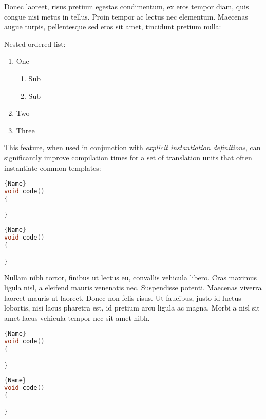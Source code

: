 Donec
laoreet, risus pretium egestas condimentum, ex eros tempor diam, quis
congue nisi metus in tellus. Proin tempor ac lectus nec elementum.
Maecenas augue turpis, pellentesque sed eros sit amet, tincidunt pretium
nulla:

Nested ordered list:

\begin{enumerate}\setlength{\leftmarginii}{6mm}
\item{One\begin{enumerate}
\item{Sub}
\item{Sub}
\end{enumerate}
}
\item{Two}
\item{Three}
\end{enumerate}

This feature, when used in conjunction with \emph{explicit instantiation
definitions}, can significantly improve compilation times for a set of
translation units that often instantiate common templates:

\noindent\begin{minipage}{.45\textwidth}
\begin{lstlisting}[language=C++, caption=code 1,frame=tb]{Name}
void code()
{

}
\end{lstlisting}
\end{minipage}\hfill
\begin{minipage}{.45\textwidth}
\begin{lstlisting}[language=C++, caption=code 2,frame=tb]{Name}
void code()
{

}
\end{lstlisting}
\end{minipage}

Nullam nibh tortor, finibus ut lectus eu, convallis vehicula libero. Cras maximus ligula nisl, a eleifend mauris venenatis nec. Suspendisse potenti. Maecenas viverra laoreet mauris ut laoreet. Donec non felis risus. Ut faucibus, justo id luctus lobortis, nisi lacus pharetra est, id pretium arcu ligula ac magna. Morbi a nisl sit amet lacus vehicula tempor nec sit amet nibh. 

\noindent\begin{minipage}{.45\textwidth}
\begin{lstlisting}[language=C++, caption=code 1 with a long and wrapping title,frame=tb]{Name}
void code()
{

}
\end{lstlisting}
\end{minipage}\hfill
\begin{minipage}{.45\textwidth}
\begin{lstlisting}[language=C++, caption=code 2 with a long and wrapping title,frame=tb]{Name}
void code()
{

}
\end{lstlisting}
\end{minipage}

